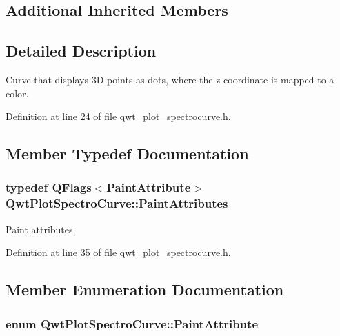 \subsection*{Additional Inherited Members}


\subsection{Detailed Description}
Curve that displays 3\-D points as dots, where the z coordinate is mapped to a color. 

Definition at line 24 of file qwt\-\_\-plot\-\_\-spectrocurve.\-h.



\subsection{Member Typedef Documentation}
\hypertarget{class_qwt_plot_spectro_curve_a78b3bf4c7d055f2f00bd371e9ddc4f2f}{
\subsubsection[{Paint\-Attributes}]{\setlength{\rightskip}{0pt plus 5cm}typedef Q\-Flags$<${\bf Paint\-Attribute}$>$ {\bf Qwt\-Plot\-Spectro\-Curve\-::\-Paint\-Attributes}}}\label{class_qwt_plot_spectro_curve_a78b3bf4c7d055f2f00bd371e9ddc4f2f}


Paint attributes. 



Definition at line 35 of file qwt\-\_\-plot\-\_\-spectrocurve.\-h.



\subsection{Member Enumeration Documentation}
\hypertarget{class_qwt_plot_spectro_curve_af6d4c6ae392f3f521db710484a059625}{
\subsubsection[{Paint\-Attribute}]{\setlength{\rightskip}{0pt plus 5cm}enum {\bf Qwt\-Plot\-Spectro\-Curve\-::\-Paint\-Attribute}}}\label{class_qwt_plot_spectro_curve_af6d4c6ae392f3f521db710484a059625}


